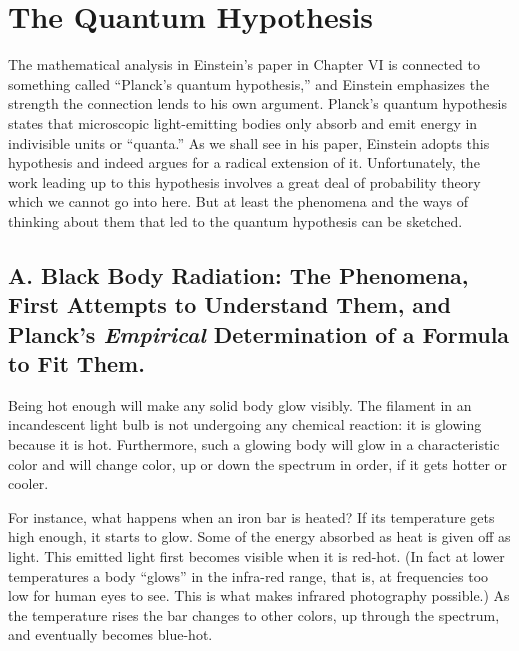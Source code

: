\chapter{The Quantum Hypothesis}




\renewcommand{\theequation}{\arabic{equation}}

The mathematical analysis in Einstein's paper in Chapter VI is connected
to something called ``Planck's quantum hypothesis,'' and Einstein
emphasizes the strength the connection lends to his own argument.
Planck's quantum hypothesis states that microscopic light-emitting
bodies only absorb and emit energy in indivisible units or ``quanta.''
As we shall see in his paper, Einstein adopts this hypothesis and indeed
argues for a radical extension of it. Unfortunately, the work leading up
to this hypothesis involves a great deal of probability theory which we
cannot go into here. But at least the phenomena and the ways of thinking
about them that led to the quantum hypothesis can be sketched.

\section*{A. Black Body Radiation: The Phenomena, First Attempts to
Understand Them, and Planck's \emph{Empirical} Determination of a
Formula to Fit Them.}

Being hot enough will make any solid body glow visibly. The filament in
an incandescent light bulb is not undergoing any chemical reaction: it
is glowing because it is hot. Furthermore, such a glowing body will glow
in a characteristic color and will change color, up or down the spectrum
in order, if it gets hotter or cooler.

For instance, what happens when an iron bar is heated? If its
temperature gets high enough, it starts to glow. Some of the energy
absorbed as heat is given off as light. This emitted light first becomes
visible when it is red-hot. (In fact at lower temperatures a body
``glows'' in the infra-red range, that is, at frequencies too low for
human eyes to see. This is what makes infrared photography possible.) As
the temperature rises the bar changes to other colors, up through the
spectrum, and eventually becomes blue-hot.

